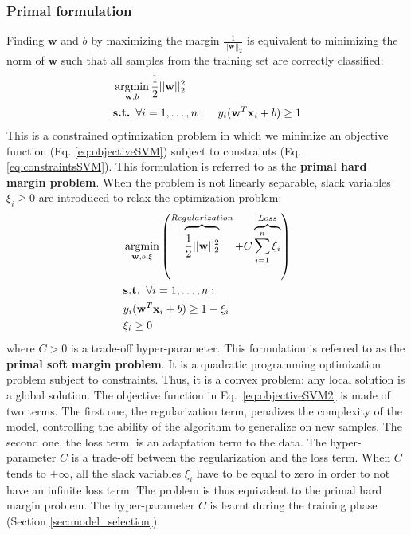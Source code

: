 


\subsubsection{Primal formulation}
Finding $\textbf{w}$ and $b$ by maximizing the margin $\frac{1}{||\textbf{w}||_2}$ is equivalent to minimizing the norm of $\textbf{w}$ such that all samples from the training set are correctly classified:
	\begin{align}
		& \argmin_{\textbf{w},b} \frac{1}{2} ||\textbf{w}||_2^2 \label{eq:objectiveSVM}\\
		& \textbf{s.t. } \forall i = 1,\ldots,n: \quad y_i(\textbf{w} ^T\textbf{x}_i+b) \geq 1 \label{eq:constraintsSVM}
	\end{align}
This is a constrained optimization problem in which we minimize an objective function (Eq. \ref{eq:objectiveSVM}) subject to constraints (Eq. \ref{eq:constraintsSVM}). This formulation is referred to as the \textbf{primal hard margin problem}. When the problem is not linearly separable, slack variables $\xi_i \geq 0$ are introduced to relax the optimization problem:
	\begin{align}
	& \argmin_{\textbf{w},b, \xi}  
	\left( 
	\overbrace{\vphantom{\sum_{i=1}^n \xi_i}
		\frac{1}{2}||\textbf{w}||^2_2}^{Regularization}
	+ C \overbrace{\sum\limits_{i=1}^{n}\xi_i}^{Loss} \right) 
	\label{eq:objectiveSVM2}\\
	& \textbf{s.t. } \forall i = 1,\ldots,n: \nonumber \\
	& y_i(\textbf{w}^T\textbf{x}_i+b) \geq 1 -\xi_i \label{eq:constraintsSVM2} \\
	&  \xi_i \geq 0 \label{eq:constraintsSVM20}
	\end{align}
\noindent where $C > 0$ is a trade-off hyper-parameter. This formulation is referred to as the \textbf{primal soft margin problem}. It is a quadratic programming optimization problem subject to constraints. Thus, it is a convex problem: any local solution is a global solution. The objective function in Eq.~\ref{eq:objectiveSVM2} is made of two terms. The first one, the regularization term, penalizes the complexity of the model, controlling the ability of the algorithm to generalize on new samples. The second one, the loss term, is an adaptation term to the data. The hyper-parameter $C$ is a trade-off between the regularization and the loss term. When $C$ tends to $+\infty$, all the slack variables $\xi_i$ have to be equal to zero in order to not have an infinite loss term. The problem is thus equivalent to the primal hard margin problem. The hyper-parameter $C$ is learnt during the training phase (Section \ref{sec:model_selection}). 


